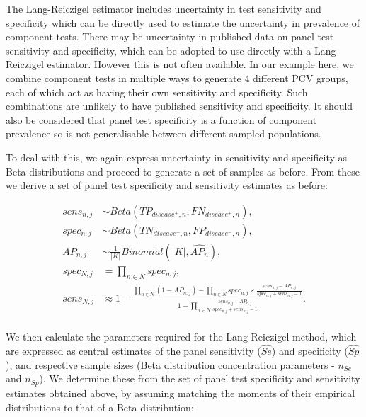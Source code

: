 \documentclass[a4paper, 12pt, twoside]{article}
\begin{document}
The Lang-Reiczigel estimator\cite{lang2014} includes uncertainty in test sensitivity and specificity which can be directly used to estimate the uncertainty in prevalence of component tests. There may be uncertainty in published data on panel test sensitivity and specificity, which can be adopted to use directly with a Lang-Reiczigel estimator. However this is not often available. In our example here, we combine component tests in multiple ways to generate 4 different PCV groups, each of which act as having their own sensitivity and specificity. Such combinations are unlikely to have published sensitivity and specificity. It should also be considered that panel test specificity is a function of component prevalence so is not generalisable between different sampled populations.

To deal with this, we again express uncertainty in sensitivity and specificity as Beta distributions and proceed to generate a set of samples as before. From these we derive a set of panel test specificity and sensitivity estimates as before:

\begin{equation*}
\begin{aligned}
sens_{n,j} &\sim Beta(TP_{disease^+,n}, FN_{disease^+,n}), \\
spec_{n,j} &\sim Beta(TN_{disease^-,n}, FP_{disease^-,n}), \\
AP_{n,j} &\sim \frac{1}{|K|}Binomial(|K|, \widehat{AP_n}), \\
spec_{N,j} &= \prod_{n \in N}{spec_{n,j}}, \\
sens_{N,j} &\approx 1-\frac{
  \prod_{n \in N}{(1-AP_{n,j})} - \prod_{n \in N}{spec_{n,j} \times \frac{sens_{n,j}-AP_{n,j}}{spec_{n,j} + sens_{n,j} - 1}}
}{
  1 - \prod_{n \in N}{ \frac{sens_{n,j}-AP_{n,j}}{spec_{n,j} + sens_{n,j} - 1} }
}. \\
\end{aligned}
\end{equation*}

We then calculate the parameters required for the Lang-Reiczigel method\cite{lang2014}, which are expressed as central estimates of the panel sensitivity (\(\widehat{Se}\)) and specificity (\(\widehat{Sp}\)), and respective sample sizes (Beta distribution concentration parameters - \(n_{Se}\) and \(n_{Sp}\)). We determine these from the set of panel test specificity and sensitivity estimates obtained above, by assuming matching the moments of their empirical distributions to that of a Beta distribution:
\end{document}
